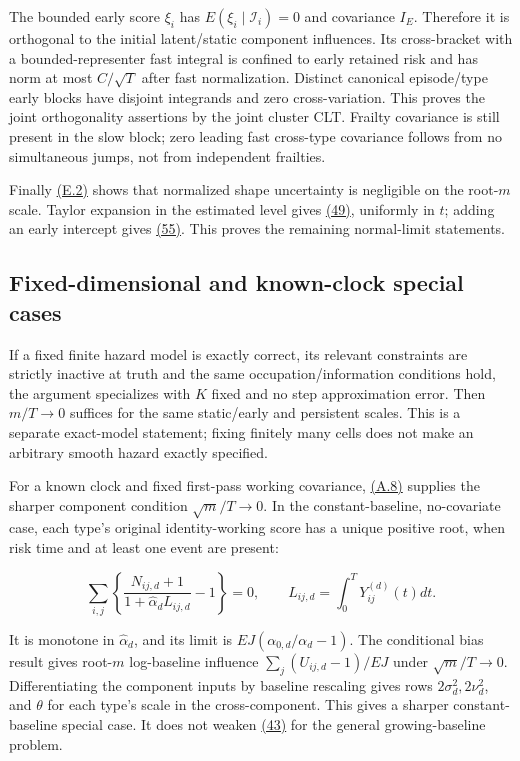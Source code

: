 \documentclass[11pt]{article}
\begin{document}
The bounded early score \(\xi_i\) has \(E(\xi_i\mid\mathcal I_i)=0\) and covariance \(I_E\). Therefore it is orthogonal to the initial latent/static component influences. Its cross-bracket with a bounded-representer fast integral is confined to early retained risk and has norm at most \(C/\sqrt T\) after fast normalization. Distinct canonical episode/type early blocks have disjoint integrands and zero cross-variation. This proves the joint orthogonality assertions by the joint cluster CLT. Frailty covariance is still present in the slow block; zero leading fast cross-type covariance follows from no simultaneous jumps, not from independent frailties.

Finally \hyperref[eq:E.2]{(E.2)} shows that normalized shape uncertainty is negligible on the root-\(m\) scale. Taylor expansion in the estimated level gives \hyperref[eq:49]{(49)}, uniformly in \(t\); adding an early intercept gives \hyperref[eq:55]{(55)}. This proves the remaining normal-limit statements.

\subsection{Fixed-dimensional and known-clock special cases}\label{sec:E.3}

If a fixed finite hazard model is exactly correct, its relevant constraints are strictly inactive at truth and the same occupation/information conditions hold, the argument specializes with \(K\) fixed and no step approximation error. Then \(m/T\to0\) suffices for the same static/early and persistent scales. This is a separate exact-model statement; fixing finitely many cells does not make an arbitrary smooth hazard exactly specified.

For a known clock and fixed first-pass working covariance, \hyperref[eq:A.8]{(A.8)} supplies the sharper component condition \(\sqrt m/T\to0\). In the constant-baseline, no-covariate case, each type's original identity-working score has a unique positive root, when risk time and at least one event are present:

\begin{equation*}
\sum_{i,j}\left\{\frac{N_{ij,d}+1}{1+\widehat\alpha_d L_{ij,d}}-1\right\}=0,
\qquad L_{ij,d}=\int_0^T Y_{ij}^{(d)}(t)dt.
\tag{E.3}\label{eq:E.3}
\end{equation*}

It is monotone in \(\widehat\alpha_d\), and its limit is
\(EJ(\alpha_{0,d}/\alpha_d-1)\). The conditional bias result gives root-\(m\) log-baseline influence
\(\sum_j(U_{ij,d}-1)/EJ\) under \(\sqrt m/T\to0\). Differentiating the component inputs by baseline rescaling gives rows \(2\sigma_d^2,2\nu_d^2\), and \(\theta\) for each type's scale in the cross-component. This gives a sharper constant-baseline special case. It does not weaken \hyperref[eq:43]{(43)} for the general growing-baseline problem.
\end{document}
